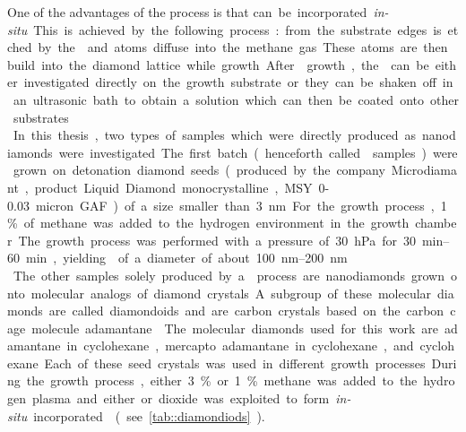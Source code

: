 

	One of the advantages of the \CVD process is that \si can be incorporated \textit{in-situ}.
	This is achieved by the following process: \si from the substrate edges is etched by the  and \si atoms diffuse into the methane gas. 
	These atoms are then build into the diamond lattice while growth.
	After \nd growth, the \nds can be either investigated directly on the growth substrate or they can be shaken off in an ultrasonic bath to obtain a solution which can then be coated onto other substrates.
	\\
	In this thesis, two types of samples which were directly produced as nanodiamonds were investigated.
	The first batch (henceforth called \CVD samples) were grown on detonation diamond seeds (produced by the company Microdiamant, product Liquid Diamond monocrystalline, MSY {0-0.03} micron GAF) of a size smaller than \SI{3}{nm}.
	For the growth process, 1\% of methane was added to the hydrogen environment in the growth chamber.
	The growth process was performed with a pressure of \SI{30}{hPa} for \SIrange{30}{60}{min}, yielding \nds of a diameter of about \SIrange{100}{200}{nm}.
	\\
	The other samples solely produced by a \CVD process are nanodiamonds grown onto molecular analogs of diamond crystals.
	A subgroup of these molecular diamonds are called diamondoids and are carbon crystals based on the carbon cage molecule adamantane .
	The molecular diamonds used for this work are adamantane in cyclohexane, mercapto adamantane in cyclohexane, and cyclohexane.
	Each of these seed crystals was used in different growth processes.
	During the growth process, either 3\% or 1\% methane was added to the hydrogen plasma and either \si or \si dioxide was exploited to form \textit{in-situ} incorporated \sivs (see \autoref{tab::diamondiods}).


